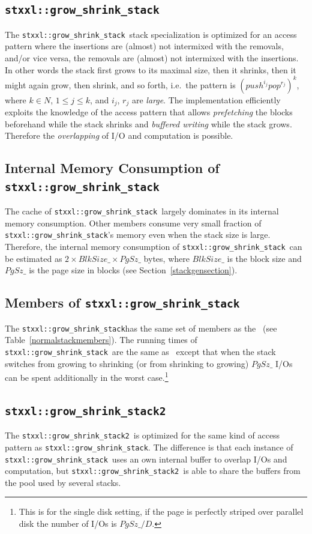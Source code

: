 \documentclass[twoside]{book}
\begin{document}
\newcommand{\xgsstack}{\texttt{stxxl::grow\_shrink\_stack}}
\subsection{\xgsstack}
The \xgsstack\ stack specialization is optimized for an
access pattern where the insertions are (almost) not intermixed with
the removals, and/or vice versa, the removals are (almost) not
intermixed with the insertions. In other words the stack first grows
to its maximal size, then it shrinks, then it might again grow, then
shrink, and so forth, i.e.\ the pattern is
$(push^{i_j}pop^{r_j})^k$, where $k \in N$, $1\leq j\leq k$, and
$i_j$, $r_j$ are \emph{large}. 
The implementation efficiently exploits the knowledge of the access
pattern that allows \emph{prefetching} the blocks beforehand while the stack
shrinks and \emph{buffered writing} while the stack grows. Therefore
the \emph{overlapping} of I/O and computation is possible.

\subsection*{Internal Memory Consumption of \xgsstack}
The cache of \xgsstack\ largely dominates in its internal memory
consumption. Other members consume very small fraction of
\xgsstack 's 
memory even when the stack size is large. Therefore, the internal
memory consumption of \xgsstack\ can be estimated as
$2 \times BlkSize\_ \times PgSz\_$ bytes, where $BlkSize\_$ is the
block size and $PgSz\_$ is the page size in blocks (see
Section~\ref{stackgensection}). 

\subsection*{Members of \xgsstack}
The \xgsstack has the same set of members as the \xnormalstack\  (see
Table~\ref{normalstackmembers}). The running times of \xgsstack\ are the
same as \xnormalstack\ except that when the stack switches from
growing to shrinking (or from shrinking to growing) $PgSz\_$ I/Os can
be spent additionally in the worst case.\footnote{This is for the single
disk setting, if the page is perfectly striped over parallel disk the
number of I/Os is $PgSz\_/D$.}

\newcommand{\xgsstacktwo}{\texttt{stxxl::grow\_shrink\_stack2}}
\subsection{\xgsstacktwo}
The \xgsstacktwo\ is optimized for the same kind of access pattern as
\xgsstack. The difference is that each instance of \xgsstack\ uses
an own internal buffer to overlap I/Os and computation, but
\xgsstacktwo\ is able to share the buffers from the pool used by
several stacks. 
\end{document}
